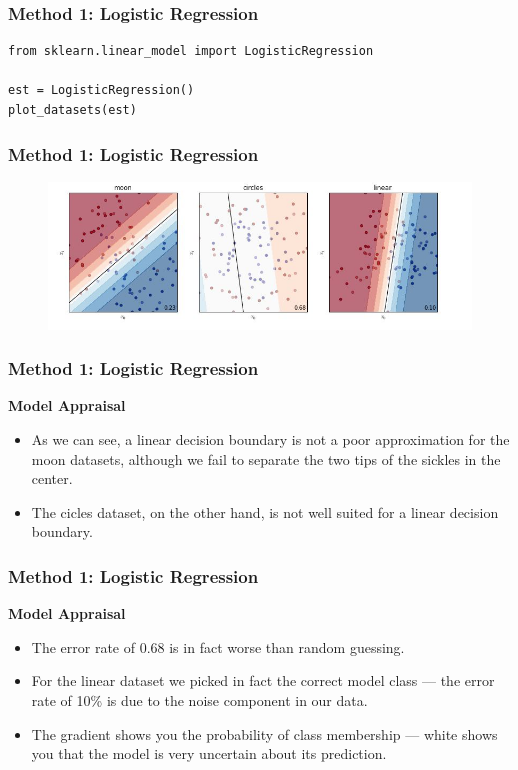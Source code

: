 \documentclass[MASTER.tex]{subfiles}
\begin{document}
\begin{frame}[fragile]
		\frametitle{Method 1: Logistic Regression}
	\begin{framed}
		\begin{verbatim}
from sklearn.linear_model import LogisticRegression

est = LogisticRegression()
plot_datasets(est)
	\end{verbatim}
\end{framed}
\end{frame}

\begin{frame}
		\frametitle{Method 1: Logistic Regression}
	\begin{figure}
		\centering
		\includegraphics[width=1.1\linewidth]{sklcass/sklclass21}
		
	\end{figure}
\end{frame}
\begin{frame}
	\frametitle{Method 1: Logistic Regression}
	\Large
	\textbf{Model Appraisal}
\begin{itemize}
\item	As we can see, a linear decision boundary is not a poor approximation for the moon datasets, although we fail to separate the two tips of the sickles in the center. 
\item The cicles dataset, on the other hand, is not well suited for a linear decision boundary. 
\end{itemize}
\end{frame}
\begin{frame}
	\frametitle{Method 1: Logistic Regression}
		\Large
		\textbf{Model Appraisal}
	\begin{itemize}
		
		\item The error rate of 0.68 is in fact worse than random guessing. \item For the linear dataset we picked in fact the correct model class — the error rate of 10\% is due to the noise component in our data. 
\item The gradient shows you the probability of class membership — white shows you that the model is very uncertain about its prediction.
\end{itemize}

\end{frame}
\end{document}

